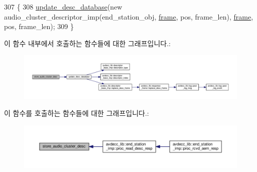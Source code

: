 \begin{DoxyCode}
307 \{
308     \hyperlink{classavdecc__lib_1_1configuration__descriptor__imp_a98445251711b644b6da09d2354003778}{update\_desc\_database}(\textcolor{keyword}{new} audio\_cluster\_descriptor\_imp(end\_station\_obj, 
      \hyperlink{gst__avb__playbin_8c_ac8e710e0b5e994c0545d75d69868c6f0}{frame}, pos, frame\_len), \hyperlink{gst__avb__playbin_8c_ac8e710e0b5e994c0545d75d69868c6f0}{frame}, pos, frame\_len);
309 \}
\end{DoxyCode}


이 함수 내부에서 호출하는 함수들에 대한 그래프입니다.\+:
\nopagebreak
\begin{figure}[H]
\begin{center}
\leavevmode
\includegraphics[width=350pt]{classavdecc__lib_1_1configuration__descriptor__imp_aa2566ff1723e552c9a79075d9fe5bb62_cgraph}
\end{center}
\end{figure}




이 함수를 호출하는 함수들에 대한 그래프입니다.\+:
\nopagebreak
\begin{figure}[H]
\begin{center}
\leavevmode
\includegraphics[width=350pt]{classavdecc__lib_1_1configuration__descriptor__imp_aa2566ff1723e552c9a79075d9fe5bb62_icgraph}
\end{center}
\end{figure}


